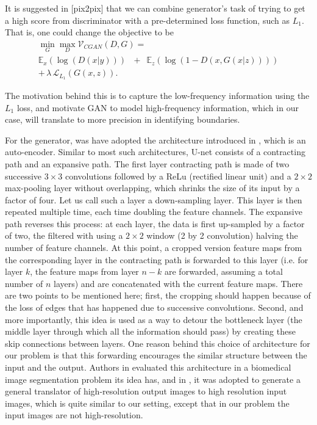 It is suggested in [pix2pix] that we can combine generator's task of trying to get a high score from discriminator with a pre-determined loss function, such as $L_1$. That is, one could change the objective to be
\begin{equation}
\begin{array}{l}
\min_G \max_D \mathcal{V}_{CGAN}(D,G) =\\
\mathbb{E}_{x}(\log(D(x|y))) \, \, \, \,+ \, \, \, \mathbb{E}_{z}(\log(1-D(x,G(x|z))))\\
+\,\lambda \, \mathcal{L}_{L_1}(G(x,z)).
\end{array}
\end{equation}

The motivation behind this is to capture the low-frequency information using the $L_1$ loss, and motivate GAN to model high-frequency information, which in our case, will translate to more precision in identifying boundaries.

For the generator, was have adopted the architecture introduced in \cite{unet}, which is an auto-encoder. Similar to most such architectures, U-net consists of a contracting path and an expansive path. The first layer contracting path is made of two successive $3 \times 3$ convolutions followed by a ReLu (rectified linear unit) and a $2 \times 2$ max-pooling layer without overlapping, which shrinks the size of its input by a factor of four. Let us call such a layer a down-sampling layer. This layer is then repeated multiple time, each time doubling the feature channels. The expansive path reverses this process: at each layer, the data is first up-sampled by a factor of two, the filtered with using a $2 \times 2$ window (2 by 2 convolution) halving the number of feature channels. At this point, a cropped version feature maps from the corresponding layer in the contracting path is forwarded to this layer (i.e. for layer $k$, the feature maps from layer $n-k$ are forwarded, assuming a total number of $n$ layers) and are concatenated with the current feature maps. There are two points to be mentioned here; first, the cropping should happen because of the loss of edges that has happened due to successive convolutions. Second, and more importantly, this idea is used as a way to detour the bottleneck layer (the middle layer through which all the information should pass) by creating these skip connections between layers. One reason behind this choice of architecture for our problem is that this forwarding encourages the similar structure between the input and the output. Authors in \cite{unet} evaluated this architecture in a biomedical image segmentation problem its idea has, and in \cite{pix2pix}, it was adopted to generate a general translator of high-resolution output images to high resolution input images, which is quite similar to our setting, except that in our problem the input images are not high-resolution.

